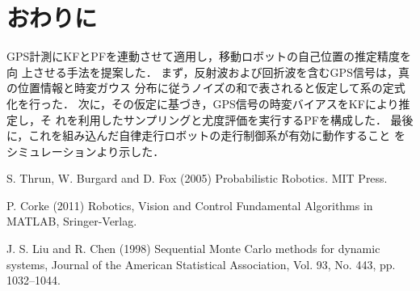 \documentclass[a4paper,10pt,twocolumn,fleqn]{jsarticle}
\begin{document}
\section{おわりに\label{sec:con}}
%
\vspace{-2mm}
GPS計測にKFとPFを連動させて適用し，移動ロボットの自己位置の推定精度を向
上させる手法を提案した．
%
まず，反射波および回折波を含むGPS信号は，真の位置情報と時変ガウス
分布に従うノイズの和で表されると仮定して系の定式化を行った．
%
次に，その仮定に基づき，GPS信号の時変バイアスをKFにより推定し，そ
れを利用したサンプリングと尤度評価を実行するPFを構成した．
%
最後に，これを組み込んだ自律走行ロボットの走行制御系が有効に動作すること
をシミュレーションより示した．

%



\vspace{-4mm}
\begin{thebibliography}{}
%
%
  S. Thrun, W. Burgard and D. Fox (2005) Probabilistic
	 Robotics. MIT Press. 

%
%
%

  P. Corke (2011) Robotics, Vision and Control Fundamental
	 Algorithms in MATLAB, Sringer-Verlag. 

  J. S. Liu and R. Chen (1998) Sequential Monte Carlo methods for
	 dynamic systems, Journal of the American Statistical
	 Association, Vol. 93, No. 443, pp. 1032--1044. 
%
\end{thebibliography}
\end{document}
